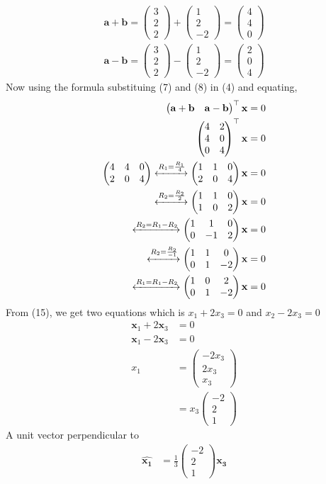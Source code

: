 \documentclass[journal,10pt,twocolumn]{article}
\newcommand{\myvec}[1]{\ensuremath{\begin{pmatrix}#1\end{pmatrix}}}
\let\vec\mathbf
\let\vec\mathbf
\begin{document}
\begin{enumerate}
\begin{align}
\vec{a+b}=\myvec{3\\2\\2}+\myvec{1\\2\\-2}=\myvec{4\\4\\0}\label{7}\\
\vec{a-b}=\myvec{3\\2\\2}-\myvec{1\\2\\-2}=\myvec{2\\0\\4}\label{8}
\end{align}
Now using the formula substituing (7) and (8) in (4) and equating,
\begin{align}
\myvec{\vec{a}+\vec{b}& \vec{a}-\vec{b}}^\top\vec{x}&=0\\
\myvec{
4&2\\
4&0\\
0&4
}^\top \vec{x}&=0\\
\myvec{
4&4&0\\
2&0&4
}
\xleftrightarrow[]{R_1=\frac{R_1}{4}}
\myvec{
1&1&0\\
2&0&4
}\vec{x}&=0\\\xleftrightarrow[]{R_2=\frac{R_2}{2}}
\myvec{
1&1&0\\
1&0&2
}\vec{x}&=0\\
\xleftrightarrow[]{R_2={R_1}-{R_2}}
\myvec{
1&1&0\\
0&-1&2
}\vec{x}&=0\\
\xleftrightarrow[]{R_2=\frac{R_2}{-1}}
\myvec{
1&1&0\\
0&1&-2
}\vec{x}&=0\\
\xleftrightarrow[]{R_1={R_1}-{R_2}}
\myvec{
1&0&2\\
0&1&-2
}\vec{x}&=0
\end{align}
From (15), we get two equations which is $x_1+2x_3=0$ and $x_2-2x_3=0$
\begin{align}
\vec{x}_1+2\vec{x}_3&=0\\
\vec{x}_1-2\vec{x}_3&=0\\
x_1&=\myvec{-2x_3\\2x_3\\x_3}\\
&=x_3\myvec{-2\\2\\1}
\end{align}
A unit vector perpendicular to 
\begin{align}
\hat{\vec{x_1}} &=\frac{1}{3}\myvec{-2\\2\\1}\vec{x_3}
\end{align}
\end{enumerate} 
\end{document}

